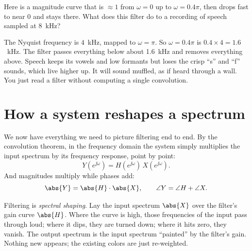 \begin{walkbox}
Here is a magnitude curve that is $\approx 1$ from $\omega=0$ up to $\omega=0.4\pi$,
then drops fast to near $0$ and stays there. What does this filter do to a
recording of speech sampled at 8~kHz?

The Nyquist frequency is $4$~kHz, mapped to $\omega=\pi$. So $\omega=0.4\pi$ is
$0.4\times 4 = 1.6$~kHz. The filter passes everything below about 1.6~kHz and
removes everything above. Speech keeps its vowels and low formants but loses the
crisp ``s'' and ``f'' sounds, which live higher up. It will sound muffled, as if
heard through a wall. You just read a filter without computing a single
convolution.
\end{walkbox}

\section{How a system reshapes a spectrum}
\label{ch14:reshape}

We now have everything we need to picture filtering end to end. By the
convolution theorem, in the frequency domain the system simply multiplies the
input spectrum by its frequency response, point by point:
\begin{equation}
  Y(e^{\jj\omega}) = H(e^{\jj\omega})\,X(e^{\jj\omega}).
  \label{ch14:multiply}
\end{equation}
And magnitudes multiply while phases add:
\[
  \abs{Y} = \abs{H}\cdot\abs{X}, \qquad \angle Y = \angle H + \angle X.
\]

\begin{happeningbox}
Filtering is \emph{spectral shaping}. Lay the input spectrum $\abs{X}$ over the
filter's gain curve $\abs{H}$. Where the curve is high, those frequencies of the
input pass through loud; where it dips, they are turned down; where it hits zero,
they vanish. The output spectrum is the input spectrum ``painted'' by the
filter's gain. Nothing new appears; the existing colors are just re-weighted.
\end{happeningbox}

